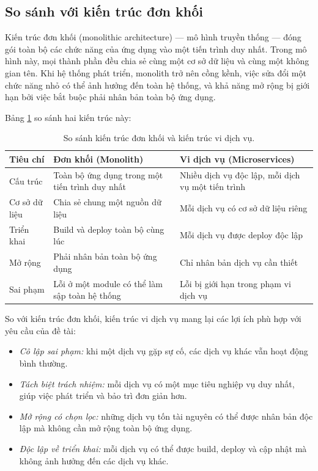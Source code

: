 \documentclass[../BTL.tex]{subfiles}
\begin{document}
\subsection{So sánh với kiến trúc đơn khối}
\label{section:2.2.2}

Kiến trúc đơn khối (monolithic architecture) --- mô hình truyền thống --- đóng gói toàn bộ các chức năng của ứng dụng vào một tiến trình duy nhất. Trong mô hình này, mọi thành phần đều chia sẻ cùng một cơ sở dữ liệu và cùng một không gian tên. Khi hệ thống phát triển, monolith trở nên cồng kềnh, việc sửa đổi một chức năng nhỏ có thể ảnh hưởng đến toàn hệ thống, và khả năng mở rộng bị giới hạn bởi việc bắt buộc phải nhân bản toàn bộ ứng dụng.

Bảng \ref{tab:monolith-vs-microservices} so sánh hai kiến trúc này:

\begin{table}[ht]
\centering
\caption{So sánh kiến trúc đơn khối và kiến trúc vi dịch vụ.}
\label{tab:monolith-vs-microservices}
\begin{tabularx}{\textwidth}{@{}p{3.2cm}XX@{}}
\toprule
Tiêu chí & Đơn khối (Monolith) & Vi dịch vụ (Microservices) \\
\midrule
Cấu trúc & Toàn bộ ứng dụng trong một tiến trình duy nhất & Nhiều dịch vụ độc lập, mỗi dịch vụ một tiến trình \\
Cơ sở dữ liệu & Chia sẻ chung một nguồn dữ liệu & Mỗi dịch vụ có cơ sở dữ liệu riêng \\
Triển khai & Build và deploy toàn bộ cùng lúc & Mỗi dịch vụ được deploy độc lập \\
Mở rộng & Phải nhân bản toàn bộ ứng dụng & Chỉ nhân bản dịch vụ cần thiết \\
Sai phạm & Lỗi ở một module có thể làm sập toàn hệ thống & Lỗi bị giới hạn trong phạm vi dịch vụ \\
\bottomrule
\end{tabularx}
\end{table}

So với kiến trúc đơn khối, kiến trúc vi dịch vụ mang lại các lợi ích phù hợp với yêu cầu của đề tài:
\begin{itemize}
    \item \textit{Cô lập sai phạm:} khi một dịch vụ gặp sự cố, các dịch vụ khác vẫn hoạt động bình thường.
    \item \textit{Tách biệt trách nhiệm:} mỗi dịch vụ có một mục tiêu nghiệp vụ duy nhất, giúp việc phát triển và bảo trì đơn giản hơn.
    \item \textit{Mở rộng có chọn lọc:} những dịch vụ tốn tài nguyên có thể được nhân bản độc lập mà không cần mở rộng toàn bộ ứng dụng.
    \item \textit{Độc lập về triển khai:} mỗi dịch vụ có thể được build, deploy và cập nhật mà không ảnh hưởng đến các dịch vụ khác.
\end{itemize}
\end{document}
